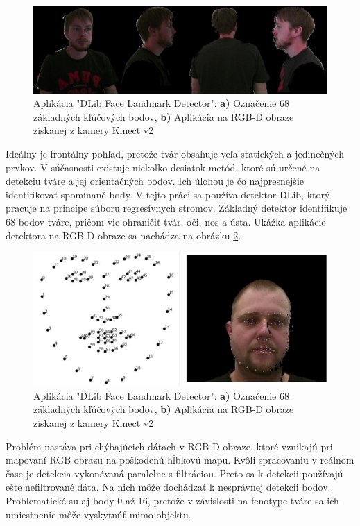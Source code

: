 \begin{figure}[H]
	\centering
	\includegraphics[width=\textwidth]{figures/rgbd_views.png}
	\caption{Aplikácia "DLib Face Landmark Detector":  \textbf{ a)} Označenie 68 základných kľúčových bodov,  \textbf{ b)} Aplikácia na RGB-D obraze získanej z kamery Kinect v2}
	\label{fig:dlib:views}
\end{figure}

Ideálny je frontálny pohľad, pretože tvár obsahuje veľa statických a jedinečných prvkov. V súčasnosti existuje niekoľko desiatok metód, ktoré sú určené na detekciu tváre a jej orientačných bodov. Ich úlohou je čo najpresnejšie identifikovať spomínané body. V tejto práci sa používa detektor DLib, ktorý pracuje na princípe súboru regresívnych stromov.
Základný detektor identifikuje 68 bodov tváre, pričom vie ohraničiť tvár, oči, nos a ústa. Ukážka aplikácie detektora na RGB-D obraze sa nachádza na obrázku \ref{fig:dlib:points}.

\begin{figure}[H]
	\centering
	\includegraphics[width=\textwidth]{figures/face_landmarks.png}
	\caption{Aplikácia "DLib Face Landmark Detector":  \textbf{ a)} Označenie 68 základných kľúčových bodov,  \textbf{ b)} Aplikácia na RGB-D obraze získanej z kamery Kinect v2}
	\label{fig:dlib:points}
\end{figure}
 
Problém nastáva pri chýbajúcich dátach v RGB-D obraze, ktoré vznikajú pri mapovaní RGB obrazu na poškodenú hĺbkovú mapu. Kvôli spracovaniu v reálnom čase je detekcia vykonávaná paralelne s filtráciou. Preto sa k detekcii používajú ešte nefiltrované dáta. Na nich môže dochádzať k nesprávnej detekcii bodov. Problematické su aj body 0 až 16, pretože v závislosti na fenotype tváre sa ich umiestnenie môže vyskytnúť mimo objektu. 

